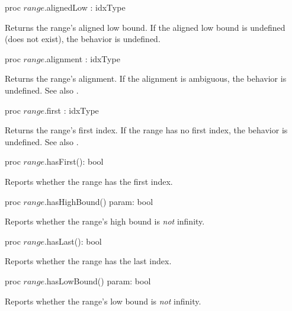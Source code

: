 \begin{protohead}
proc $range$.alignedLow : idxType
\end{protohead}
\begin{protobody}
Returns the range's aligned low bound.
If the aligned low bound is undefined (does not exist),
the behavior is undefined.
\end{protobody}

\begin{protohead}
proc $range$.alignment : idxType
\end{protohead}
\begin{protobody}
Returns the range's alignment.
If the alignment is ambiguous, the behavior is undefined.
See also .
\end{protobody}

\begin{protohead}
proc $range$.first : idxType
\end{protohead}
\begin{protobody}
Returns the range's first index.
If the range has no first index, the behavior is undefined.
See also .
\end{protobody}

\begin{protohead}
proc $range$.hasFirst(): bool
\end{protohead}
\begin{protobody}
Reports whether the range has the first index.
\end{protobody}

\begin{protohead}
proc $range$.hasHighBound() param: bool
\end{protohead}
\begin{protobody}
Reports whether the range's high bound is \emph{not} infinity.
\end{protobody}

\begin{protohead}
proc $range$.hasLast(): bool
\end{protohead}
\begin{protobody}
Reports whether the range has the last index.
\end{protobody}

\begin{protohead}
proc $range$.hasLowBound() param: bool
\end{protohead}
\begin{protobody}
Reports whether the range's low bound is \emph{not} infinity.
\end{protobody}

